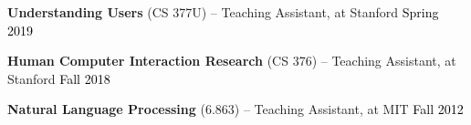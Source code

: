 
\textbf{Understanding Users} (CS 377U) -- Teaching Assistant, at Stanford \hfill \textcolor{black}{Spring 2019}

\textbf{Human Computer Interaction Research} (CS 376) -- Teaching Assistant, at Stanford \hfill \textcolor{black}{Fall 2018}

\textbf{Natural Language Processing} (6.863) -- Teaching Assistant, at MIT \hfill \textcolor{black}{Fall 2012}\\






